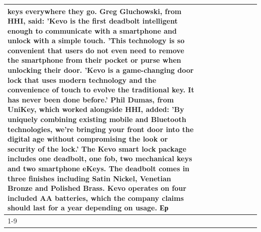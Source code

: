 \begin{table}[H]
\begin{tabular}{lllrlllll}
keys everywhere they go. Greg Gluchowski, from HHI, said: 'Kevo is the first deadbolt intelligent enough to communicate with a smartphone and unlock with a simple touch. 'This technology is so convenient that users do not even need to remove the smartphone from their pocket or purse when unlocking their door. 'Kevo is a game-changing door lock that uses modern technology and the convenience of touch to evolve the traditional key. It has never been done before.' Phil Dumas, from UniKey, which worked alongside HHI, added: 'By uniquely combining existing mobile and Bluetooth technologies, we’re bringing your front door into the digital age without compromising the look or security of the lock.' The Kevo smart lock package includes one deadbolt, one fob, two mechanical keys and two smartphone eKeys. The deadbolt comes in three finishes including Satin Nickel, Venetian Bronze and Polished Brass. Kevo operates on four included AA batteries, which the company claims should last for a year depending on usage. Ер \\
\cline{1-9}

\end{tabular}
\end{table}
